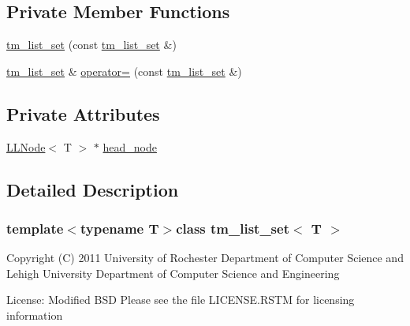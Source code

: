 \subsection*{Private Member Functions}
\begin{DoxyCompactItemize}
\item 
\hyperlink{classtm__list__set_aef1f37c9533846bdb6c90783a3f45ea9}{tm\-\_\-list\-\_\-set} (const \hyperlink{classtm__list__set}{tm\-\_\-list\-\_\-set} \&)
\item 
\hyperlink{classtm__list__set}{tm\-\_\-list\-\_\-set} \& \hyperlink{classtm__list__set_a01c6fcd7e6bff3ff93c788359c065d4a}{operator=} (const \hyperlink{classtm__list__set}{tm\-\_\-list\-\_\-set} \&)
\end{DoxyCompactItemize}
\subsection*{Private Attributes}
\begin{DoxyCompactItemize}
\item 
\hyperlink{classLLNode}{L\-L\-Node}$<$ T $>$ $\ast$ \hyperlink{classtm__list__set_add7bec95ca62fae4d4e0d4421c7c3dde}{head\-\_\-node}
\end{DoxyCompactItemize}


\subsection{Detailed Description}
\subsubsection*{template$<$typename T$>$class tm\-\_\-list\-\_\-set$<$ T $>$}

Copyright (C) 2011 University of Rochester Department of Computer Science and Lehigh University Department of Computer Science and Engineering

License\-: Modified B\-S\-D Please see the file L\-I\-C\-E\-N\-S\-E.\-R\-S\-T\-M for licensing information 


